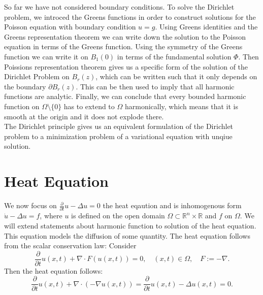 \documentclass[A4,12pt,twoside]{book}
\begin{document}
    So far we have not considered boundary conditions. To solve the Dirichlet problem, we introced the Greens functions in order to construct solutions for the Poisson equation with boundary condition $u=g$. Using Greens identities and the Greens representation theorem we can write down the solution to the Poisson equation in terms of the Greens function. Using the symmetry of the Greens function we can write it on $B_1 (0)$ in terms of the fundamental solution $\Phi$. Then Poissions representation theorem gives us a specific form of the solution of the Dirichlet Problem on $B_r (z)$, which can be written such that it only depends on the boundary $\partial B_r (z)$. This can be then used to imply that all harmonic functions are analytic. Finally, we can conclude that every bounded harmonic function on $\Omega \setminus \{0\}$ has to extend to $\Omega$ harmonically, which means that it is smooth at the origin and it does not explode there.\\
    The Dirichlet principle gives us an equivalent formulation of the Dirichlet problem to a minimization problem of a variational equation with unqiue solution.


\chapter{Heat Equation}
We now focus on $\frac{\partial}{\partial t} u - \Delta u=0$ the heat eqaution and is inhomogenous form $\dot{u} - \Delta u=f$, where $u$ is defined on the open domain $\Omega \subset \mathbb{R}^n \times \mathbb{R}$ and $f$ on $\Omega$. We will extend statements about harmonic function to solution of the heat equation. This equation models the diffusion of some quantity. The heat equation follows from the scalar conservation law: Consider 
\[
\frac{\partial}{\partial t} u(x,t) + \nabla \cdot F(u(x,t)) = 0, \quad (x,t) \in \Omega, \quad F := -\nabla.
\]
Then the heat equation follows:
\[
\frac{\partial}{\partial t} u(x,t) + \nabla \cdot (- \nabla u(x,t)) = \frac{\partial}{\partial t} u(x,t) - \Delta u(x,t) = 0.
\]
\end{document}
